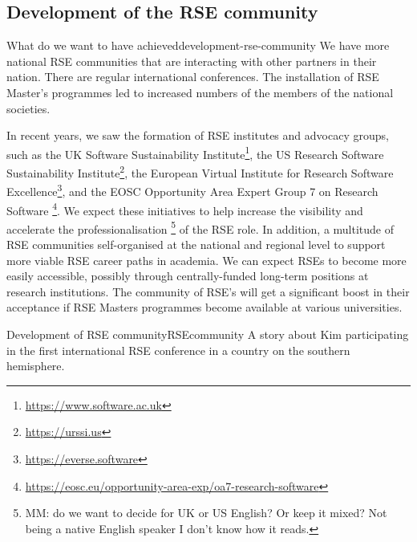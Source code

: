\documentclass{eceasst}
\begin{document}
\subsection{Development of the RSE community}
\begin{whatis}{What do we want to have achieved}{development-rse-community}
We have more national RSE communities that are interacting with other partners in their nation.
There are regular international conferences. The installation of RSE Master's programmes led to
increased numbers of the members of the national societies.
\end{whatis}
In recent years, we saw the formation of RSE institutes and advocacy groups, such as
the UK Software Sustainability Institute\footnote{\url{https://www.software.ac.uk}},
the US Research Software Sustainability Institute\footnote{\url{https://urssi.us}},
the European Virtual Institute for Research Software Excellence\footnote{\url{https://everse.software}},
and the EOSC Opportunity Area Expert Group 7 on Research Software%
\footnote{\url{https://eosc.eu/opportunity-area-exp/oa7-research-software}}.
We expect these initiatives to help increase the visibility and accelerate
the professionalisation%
\footnote{MM: do we want to decide for UK or US English? Or keep it mixed? Not being a native English speaker I don't know how it reads.}
of the RSE role.
In addition, a multitude of RSE communities self-organised at the national
and regional level to support more viable RSE career paths in academia.
We can expect RSEs to become more easily accessible,
possibly through centrally-funded long-term positions at research institutions.
The community of RSE's will get a significant boost in their acceptance if RSE Masters programmes
become available at various universities.

\begin{story}{Development of RSE community}{RSEcommunity}
A story about Kim participating in the first international RSE conference in a country on the southern hemisphere.
\end{story}
\end{document}
